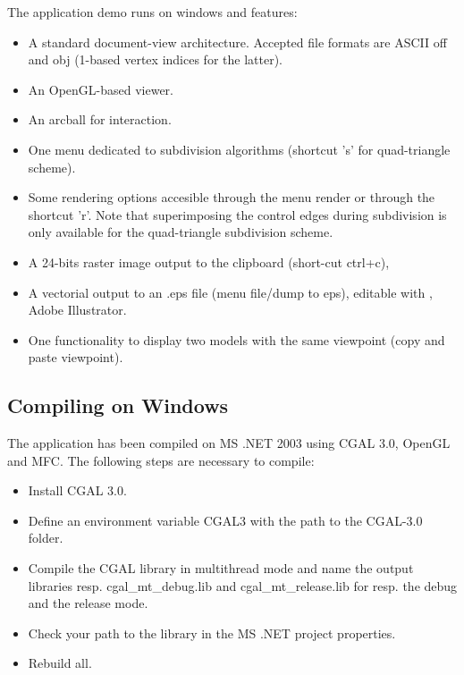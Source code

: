 The application demo runs on windows and features:
\begin{itemize}

\item 
A standard document-view architecture. Accepted file formats are ASCII
off and obj (1-based vertex indices for the latter).

\item 
An OpenGL-based viewer.

\item 
An arcball for interaction.

\item 
One menu dedicated to subdivision algorithms (shortcut 's' for
quad-triangle scheme).

\item 
Some rendering options accesible through the menu render or through
the shortcut 'r'. Note that superimposing the control edges during
subdivision is only available for the quad-triangle subdivision
scheme.

\item 
A 24-bits raster image output to the clipboard (short-cut ctrl+c),

\item 
A vectorial output to an .eps file (menu file/dump to eps), editable
with , Adobe Illustrator.

\item 
One functionality to display two models with the same viewpoint (copy
and paste viewpoint).

\end{itemize}

\subsection{Compiling on Windows}

The application has been compiled on MS .NET 2003 using CGAL 3.0,
OpenGL and MFC. The following steps are necessary to compile:
\begin{itemize}
\item Install CGAL 3.0.
\item Define an environment variable CGAL3 with the path to the CGAL-3.0 folder.
\item Compile the CGAL library in multithread mode and name the output 
      libraries resp. cgal\_mt\_debug.lib and cgal\_mt\_release.lib 
      for resp. the debug and the release mode.
\item Check your path to the library in the MS .NET project
      properties.
\item Rebuild all.
\end{itemize}
